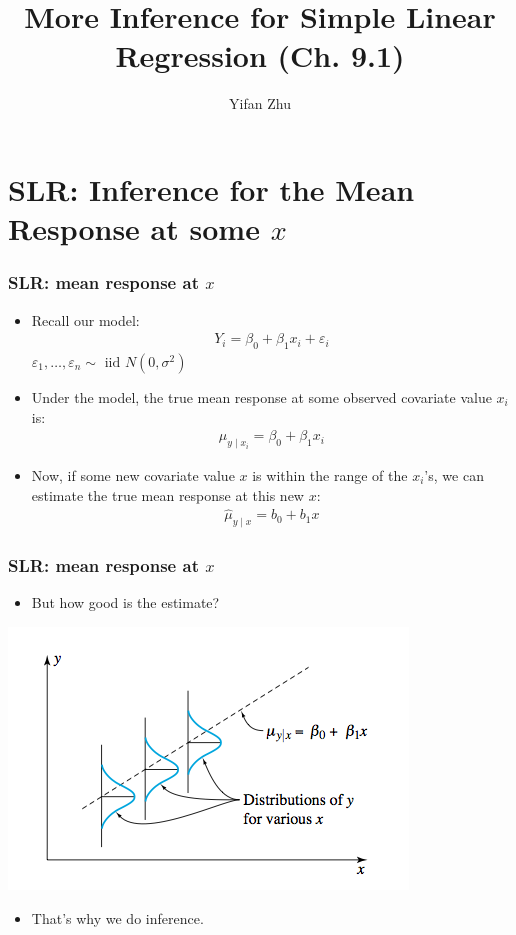 \documentclass[handout]{beamer}\usepackage[]{graphicx}\usepackage[]{color}
\title{More Inference for Simple Linear Regression (Ch. 9.1)}
\author{Yifan Zhu}
\date{}
\institute{Iowa State University}
\providecommand{\e}{\varepsilon}
\providecommand{\wh}[1]{\widehat{#1}}
\numberwithin{equation}{section}
\begin{document}
\begin{frame}
\titlepage
 \end{frame}
 


\section{SLR: Inference for the Mean Response at some $x$}

\begin{frame}
\frametitle{SLR: mean response at $x$}
\begin{itemize}
\item Recall our model:
\begin{align*}
Y_i = \beta_0 + \beta_1 x_i + \e_i
\end{align*}
$\e_1, \ldots, \e_n \sim \text{ iid } N(0, \sigma^2)$
\pause \item Under the model, the true mean response at some observed covariate value $x_i$ is:
\begin{align*}
\mu_{y \mid x_i} = \beta_0 + \beta_1 x_i
\end{align*}
\pause \item Now, if some new covariate value $x$ is within the range of the $x_i$'s, we can estimate the true mean response at this new $x$:
\begin{align*}
\wh{\mu}_{y \mid x} = b_0 + b_1 x
\end{align*}
\end{itemize}
\end{frame}


\begin{frame}
\frametitle{SLR: mean response at $x$}
\begin{itemize}
\item But how good is the estimate?
\end{itemize}
 \includegraphics{../../fig/normalsimplereg.png}
\begin{itemize}
\item That's why we do inference.
\end{itemize}
\end{frame}
\end{document}
